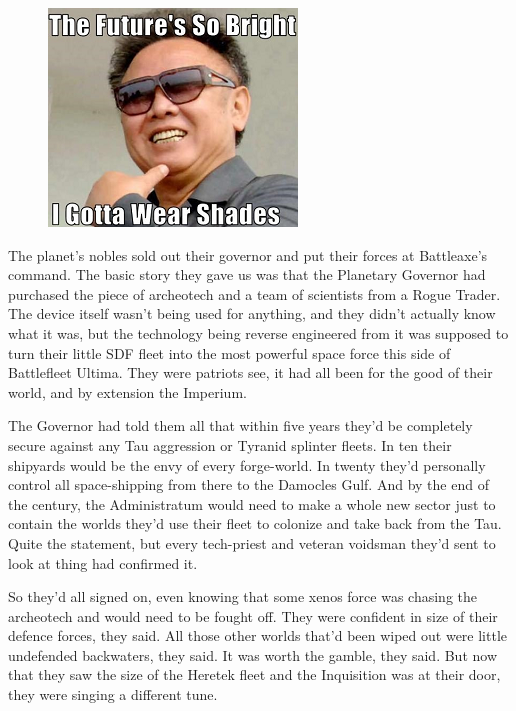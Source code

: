 \begin{figure}
	\begin{center}
		\includegraphics[width=\figwidth]{pics/11/73.png}
	\end{center}
\end{figure}
The planet's nobles sold out their governor and put their forces at Battleaxe's command. 
The basic story they gave us was that the Planetary Governor had purchased the piece of archeotech and a team of scientists from a Rogue Trader. 
The device itself wasn't being used for anything, and they didn't actually know what it was, but the technology being reverse engineered from it was supposed to turn their little SDF fleet into the most powerful space force this side of Battlefleet Ultima. 
They were patriots see, it had all been for the good of their world, and by extension the Imperium.

The Governor had told them all that within five years they'd be completely secure against any Tau aggression or Tyranid splinter fleets. 
In ten their shipyards would be the envy of every forge-world. 
In twenty they'd personally control all space-shipping from there to the Damocles Gulf. 
And by the end of the century, the Administratum would need to make a whole new sector just to contain the worlds they'd use their fleet to colonize and take back from the Tau. 
Quite the statement, but every tech-priest and veteran voidsman they'd sent to look at thing had confirmed it. 


So they'd all signed on, even knowing that some xenos force was chasing the archeotech and would need to be fought off. 
They were confident in size of their defence forces, they said. 
All those other worlds that'd been wiped out were little undefended backwaters, they said. 
It was worth the gamble, they said. 
But now that they saw the size of the Heretek fleet and the Inquisition was at their door, they were singing a different tune.

